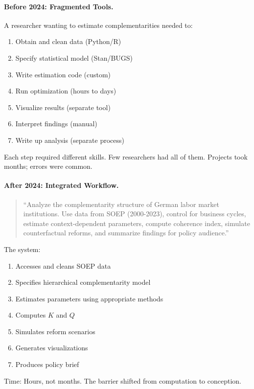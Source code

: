 \paragraph{Before 2024: Fragmented Tools.}
A researcher wanting to estimate complementarities needed to:
\begin{enumerate}
  \item Obtain and clean data (Python/R)
  \item Specify statistical model (Stan/BUGS)
  \item Write estimation code (custom)
  \item Run optimization (hours to days)
  \item Visualize results (separate tool)
  \item Interpret findings (manual)
  \item Write up analysis (separate process)
\end{enumerate}

Each step required different skills. Few researchers had all of them.
Projects took months; errors were common.

\paragraph{After 2024: Integrated Workflow.}
\begin{quote}
``Analyze the complementarity structure of German labor market institutions.
Use data from SOEP (2000-2023), control for business cycles,
estimate context-dependent parameters, compute coherence index,
simulate counterfactual reforms, and summarize findings for policy audience.''
\end{quote}

The system:
\begin{enumerate}
  \item Accesses and cleans SOEP data
  \item Specifies hierarchical complementarity model
  \item Estimates parameters using appropriate methods
  \item Computes $K$ and $Q$
  \item Simulates reform scenarios
  \item Generates visualizations
  \item Produces policy brief
\end{enumerate}

Time: Hours, not months. The barrier shifted from computation to conception.

